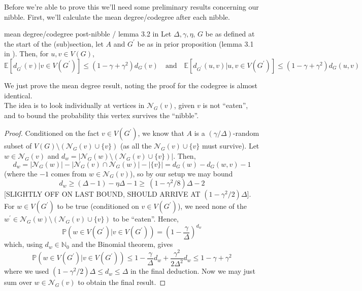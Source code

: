 \documentclass{article}
\begin{document}
Before we're able to prove this we'll need some preliminary results concerning our nibble. First, we'll calculate the 
mean degree/codegree after each nibble. 

\begin{lemma}[]{mean degree/codegree post-nibble / lemma 3.2 in \cite{campos2023}}
    Let $\Delta, \gamma, \eta$, $G$ be as defined at the start of the (sub)section, let $A$ and $G^\prime$ be as in 
    prior proposition (lemma 3.1 in \cite{campos2023}). Then, for $u, v \in V(G)$, 
    \[\mathbb{E}[d_{G^\prime}(v) | v \in V(G^\prime)] \leq (1 - \gamma + \gamma^2)d_G(v) \quad \text{and} \quad
    \mathbb{E}[d_{G^\prime}(u, v) | u, v \in V(G^\prime)] \leq (1 - \gamma + \gamma^2)d_G(u, v)\]
\end{lemma}

We just prove the mean degree result, noting the proof for the codegree is almost identical. \\

The idea is to look individually at vertices in $\mathcal{N}_G(v)$, given $v$ is not ``eaten'', and to bound the 
probability this vertex survives the ``nibble''.

\begin{proof}
     Conditioned on the fact $v \in V(G^\prime)$, we know that $A$ is a $(\gamma/\Delta)$-random subset of 
     $V(G) \setminus (\mathcal{N}_G(v) \cup \{v\})$ (as all the $\mathcal{N}_G(v) \cup \{v\}$ must survive). 
     Let $w \in \mathcal{N}_G(v)$ and $d_w = |\mathcal{N}_G(w) \setminus (\mathcal{N}_G(v) \cup \{v\})|$. 
     Then, \[d_w = |\mathcal{N}_G(w)| - |\mathcal{N}_G(v) \cap \mathcal{N}_G(w)| - |\{v\}| 
     = d_G(w) - d_G(w, v) - 1\]
     (where the $-1$ comes from $w \in \mathcal{N}_G(v)$), so by our setup we may bound 
     \[d_w \geq (\Delta - 1) - \eta\Delta - 1 \geq \ (1 - \gamma^2/8)\Delta - 2\]
     [SLIGHTLY OFF ON LAST BOUND, SHOULD ARRIVE AT $(1 - \gamma^2/2)\Delta$]. \\
     For $w \in V(G^\prime)$ to be true (conditioned on $v \in V(G^\prime)$), we need none of the $w^\prime \in 
     \mathcal{N}_G(w) \setminus (\mathcal{N}_G(v) \cup \{v\})$ to be ``eaten''. Hence, 
     \[\mathbb{P}(w \in V(G^\prime) | v \in V(G^\prime)) = \left(1 - \frac{\gamma}{\Delta}\right)^{d_w}\]
     which, using $d_w \in \mathbb{N}_0$ and the Binomial theorem, gives 
     \[\mathbb{P}(w \in V(G^\prime) | v \in V(G^\prime)) \leq 1 - \frac{\gamma}{\Delta}d_w + \frac{\gamma^2}{2\Delta^2}d_w
     \leq 1 - \gamma + \gamma^2\] where we used $(1-\gamma^2/2)\Delta \leq d_w \leq \Delta$ in the final deduction. 
     Now we may just sum over $w \in \mathcal{N}_G(v)$ to obtain the final result.
\end{proof}
\end{document}
